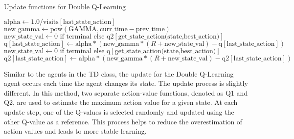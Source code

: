 \begin{algorithm}
\caption{Update functions for Double Q-Learning}\label{dqlUpdate}
\begin{algorithmic}
\State $ \text{alpha} \gets 1.0 / \text{visits}[ \text{last_state_action}]$
\State $ \text{new_gamma} \gets \text{pow}( \text{GAMMA}, \text{curr_time} - \text{prev_time})$
\State $ \text{new_state_val} \gets 0 \text{ if } \text{terminal else } \text{q2}[ \text{get_state_action(state,best_action)}]$
\State $ \text{q}[ \text{last_state_action}] \gets \text{alpha} * ( \text{new_gamma} * (R + \text{new_state_val}) - \text{q}[ \text{last_state_action}])$
\Else
\State $ \text{new_state_val} \gets 0 \text{ if } \text{terminal else } \text{q}[ \text{get_state_action(state,best_action)}]$
\State $ \text{q2}[ \text{last_state_action}] \gets \text{alpha} * ( \text{new_gamma} * (R + \text{new_state_val}) - \text{q2}[ \text{last_state_action}])$
\EndIf
\end{algorithmic}
\end{algorithm}

Similar to the agents in the TD class, the update for the Double Q-Learning agent occurs each time the agent changes its state. The update process is slightly different. In this method, two separate action-value functions, denoted as Q1 and Q2, are used to estimate the maximum action value for a given state. At each update step, one of the Q-values is selected randomly and updated using the other Q-value as a reference. This process helps to reduce the overestimation of action values and leads to more stable learning.